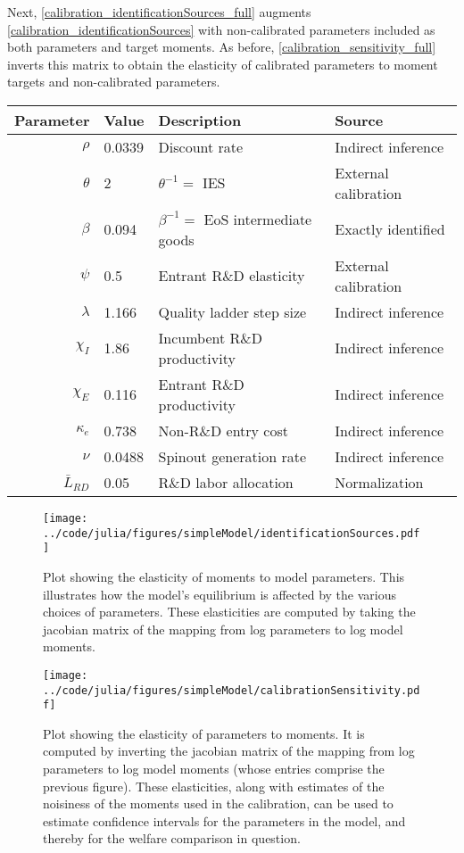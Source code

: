 \documentclass[11pt,english]{article}
\theoremstyle{remark}
\begin{document}
Next, \autoref{calibration_identificationSources_full} augments \autoref{calibration_identificationSources} with non-calibrated parameters included as both parameters and target moments. As before, \autoref{calibration_sensitivity_full} inverts this matrix to obtain the elasticity of calibrated parameters to moment targets and non-calibrated parameters. 

\begin{table}[]
	\centering
	\label{calibration_parameters}
	\begin{tabular}{rlll}
		\toprule \toprule
		Parameter & Value & Description & Source \tabularnewline
		\midrule
		$\rho$ & 0.0339 & Discount rate  & Indirect inference \tabularnewline
		$\theta$ & 2 & $\theta^{-1} = $ IES & External calibration 
		\tabularnewline
		$\beta$ & 0.094 & $\beta^{-1} = $ EoS intermediate goods & Exactly identified \tabularnewline 
		$\psi$ & 0.5 & Entrant R\&D elasticity & External calibration \tabularnewline
		$\lambda$ & 1.166 & Quality ladder step size & Indirect inference 
		\tabularnewline
		$\chi_I$ & 1.86 & Incumbent R\&D productivity & Indirect inference 
		\tabularnewline
		$\chi_E$ & 0.116 & Entrant R\&D productivity & Indirect inference \tabularnewline 
		$\kappa_e$ & 0.738 & Non-R\&D entry cost & Indirect inference \tabularnewline
		$\nu$ & 0.0488 & Spinout generation rate  & Indirect inference\tabularnewline
		$\bar{L}_{RD}$ & 0.05 & R\&D labor allocation  & Normalization \tabularnewline
		\bottomrule
	\end{tabular}
\end{table}

\begin{figure}[]
	\texttt{[image: ../code/julia/figures/simpleModel/identificationSources.pdf]}
	\caption{Plot showing the elasticity of moments to model parameters. This illustrates how the model's equilibrium is affected by the various choices of parameters. These elasticities are computed by taking the jacobian matrix of the mapping from log parameters to log model moments.}
	\label{calibration_identificationSources}
\end{figure}

\begin{figure}[]
	\texttt{[image: ../code/julia/figures/simpleModel/calibrationSensitivity.pdf]}
	\caption{Plot showing the elasticity of parameters to moments. It is computed by inverting the jacobian matrix of the mapping from log parameters to log model moments (whose entries comprise the previous figure). These elasticities, along with estimates of the noisiness of the moments used in the calibration, can be used to estimate confidence intervals for the parameters in the model, and thereby for the welfare comparison in question.}
	\label{calibration_sensitivity}
\end{figure}
\end{document}
